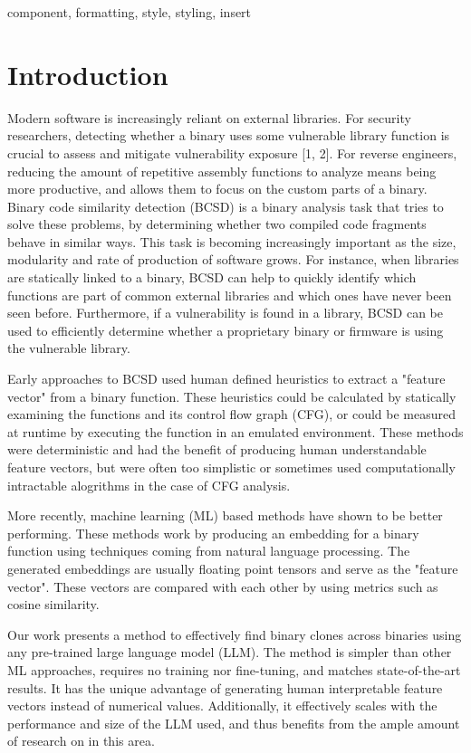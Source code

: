 \documentclass[conference,compsoc]{IEEEtran}
\begin{document}
\begin{IEEEkeywords}
component, formatting, style, styling, insert
\end{IEEEkeywords}

\section{Introduction}

Modern software is increasingly reliant on external libraries.
For security researchers, detecting whether a binary uses some vulnerable library function is crucial to assess
and mitigate vulnerability exposure [1, 2]. For reverse engineers, reducing the amount of repetitive assembly functions
to analyze means being more productive, and allows them to focus on the custom parts of a binary.  Binary code similarity
detection (BCSD) is a binary analysis task that tries to solve these problems, by determining whether two compiled
code fragments behave in similar ways. This task is becoming increasingly important as the size, modularity and rate of
production of software grows.  For instance, when libraries are statically linked to a binary, BCSD can help to
quickly identify which functions are part of common external libraries and which ones have never been seen before.
Furthermore, if a vulnerability is found in a library, BCSD can be used to efficiently determine whether a proprietary
binary or firmware is using the vulnerable library.

Early approaches to BCSD used human defined heuristics to extract a "feature vector" from a binary function. These heuristics
could be calculated by statically examining the functions and its control flow graph (CFG), or could be measured at runtime
by executing the function in an emulated environment. These methods were deterministic and had the benefit of producing
human understandable feature vectors, but were often too simplistic or sometimes used computationally intractable alogrithms in
the case of CFG analysis.

More recently, machine learning (ML) based methods have shown to be better performing.
These methods work by producing an embedding for a binary function using techniques coming from natural language processing.
The generated embeddings are usually floating point tensors and serve as the "feature vector". These vectors are compared
with each other by using metrics such as cosine similarity.

Our work presents a method to effectively find binary clones across binaries using any pre-trained large language model (LLM).
The method is simpler than other ML approaches, requires no training nor fine-tuning, and matches state-of-the-art results.
It has the unique advantage of generating human interpretable feature vectors instead of numerical values. Additionally,
it effectively scales with the performance and size of the LLM used, and thus benefits from the ample amount of research
on in this area.
\end{document}
